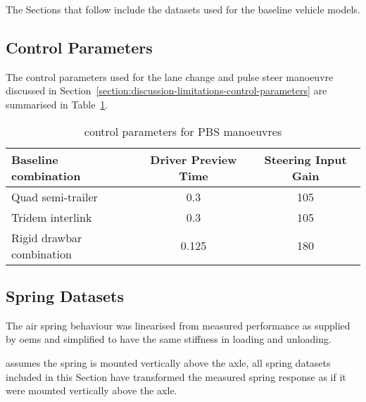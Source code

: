 The Sections that follow include the \trucksim{} datasets used for the baseline vehicle models.

\subsection{Control Parameters}\label{section:control-parameters}

The control parameters used for the lane change and pulse steer manoeuvre discussed in Section~\ref{section:discussion-limitations-control-parameters} are summarised in Table~\ref{table:baseline-manoeuvre-control-parameters}.


\begin{table}[H]
  \centering\footnotesize
  \caption{\trucksim{} control parameters for PBS manoeuvres}
    \begin{tabular}{lcc}
    \toprule
    \textbf{Baseline combination} & \textbf{Driver Preview Time} & \textbf{Steering Input Gain} \\
    \midrule
    Quad semi-trailer & 0.3 & 105 \\
    Tridem interlink & 0.3 & 105 \\
    Rigid drawbar combination & 0.125 & 180 \\
    \bottomrule
    \end{tabular}%
  \label{table:baseline-manoeuvre-control-parameters}%
\end{table}%


\subsection{Spring Datasets}\label{section:baseline-spring-datasets}

 The air spring behaviour was linearised from measured performance as supplied by \glspl{oem} and simplified to have the same stiffness in loading and unloading.

 \trucksim{} assumes the spring is mounted vertically above the axle, all spring datasets included in this Section have transformed the measured spring response as if it were mounted vertically above the axle.
 
